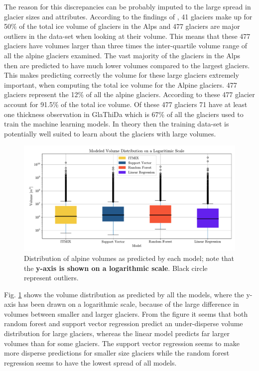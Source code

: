 The reason for this discrepancies can be probably imputed to the large spread in glacier sizes and attributes. According to the findings of \citet{Farinotti2019}, 41 glaciers make up for 50\% of the total ice volume of glaciers in the Alps and 477 glaciers are major outliers in the data-set when looking at their volume. This means that these 477 glaciers have volumes larger than three times the inter-quartile volume range of all the alpine glaciers examined. The vast majority of the glaciers in the Alps then are predicted to have much lower volumes compared to the largest glaciers. This makes predicting correctly the volume for these large glaciers extremely important, when computing the total ice volume for the Alpine glaciers. 477 glaciers represent the 12\% of all the alpine glaciers. According to \citet{Farinotti2019} these 477 glacier account for 91.5\% of the total ice volume.  Of these 477 glaciers 71 have at least one thickness observation in GlaThiDa which is 67\% of all the glaciers used to train the machine learning models. In theory then the training data-set is potentially well suited to learn about the glaciers with large volumes.  

\begin{figure}[!tp]
	\centering		  
	\includegraphics[width=1.\textwidth]{figures/vol_box.pdf}
	\caption{Distribution of alpine volumes as predicted by each model; note that the \textbf{y-axis is shown on a logarithmic scale}. Black circle represent outliers.}
	\label{fig:vol-dist}
\end{figure}

Fig. \ref{fig:vol-dist} shows the volume distribution as predicted by all the models, where the y-axis has been drawn on a logarithmic scale, because of the large difference in volumes between smaller and larger glaciers. From the figure it seems that both random forest and support vector regression predict an under-disperse volume distribution for large glaciers, whereas the linear model predicts far larger volumes than \citet{Farinotti2019} for some glaciers. The support vector regression seems to make more disperse predictions for smaller size glaciers while the random forest regression seems to have the lowest spread of all models.

